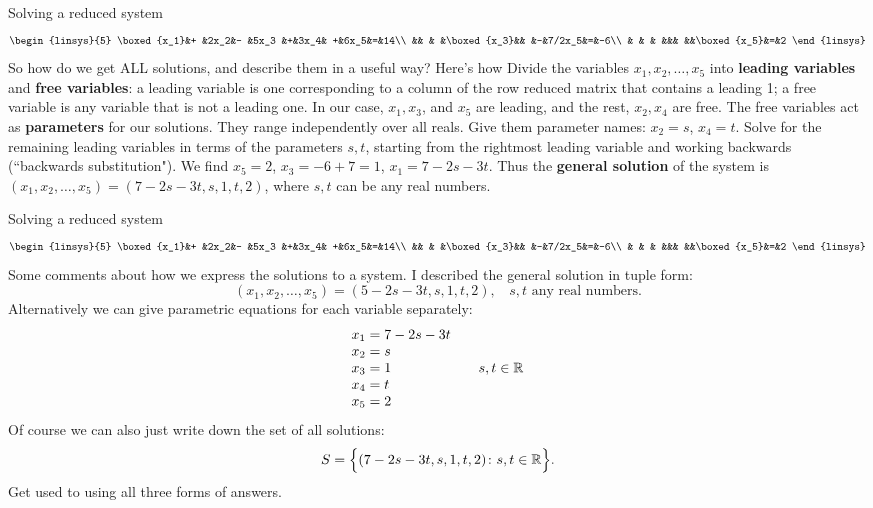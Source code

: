 \begin{frame}{Solving a reduced system}\footnotesize
\footnotesize
\[
\begin{linsys}{5}
\boxed{x_1}&+ &2x_2&- &5x_3 &+&3x_4& +&6x_5&=&14\\
&& & &\boxed{x_3}&& &-&7/2x_5&=&-6\\
 & & & &&& &&\boxed{x_5}&=&2
\end{linsys}
\]
So how do we get \alert{ALL} solutions, and describe them in a useful way? Here's how
\bb
\pause\ii Divide the variables $x_1, x_2, \dots, x_5$ into {\bf leading variables} and {\bf free variables}:
\pause a leading variable is one corresponding to a column of the row reduced matrix that contains a leading 1;
\pause a free variable is any variable that is not a leading one. 
\bpause In our case, $x_1, x_3$, and $x_5$ are leading, and the rest, $x_2, x_4$ are free. 
\pause\ii  The free variables act as {\bf parameters} for our solutions. They range independently over all reals. Give them parameter names: $x_2=s$, $x_4=t$. 
\pause\ii Solve for the remaining leading variables in terms of the parameters $s, t$, starting from the rightmost leading variable and working backwards (``backwards substitution"). 
\pause We find $x_5=2$, $x_3=-6+7=1$, $x_1=7-2s-3t$. 
\ee
\pause Thus the {\bf general solution} of the system is  $(x_1,x_2,\dots,x_5)=(7-2s-3t, s, 1, t, 2)$, where $s,t$ can be any real numbers. 
\end{frame}
\begin{frame}{Solving a reduced system}
\footnotesize
\[
\begin{linsys}{5}
\boxed{x_1}&+ &2x_2&- &5x_3 &+&3x_4& +&6x_5&=&14\\
&& & &\boxed{x_3}&& &-&7/2x_5&=&-6\\
 & & & &&& &&\boxed{x_5}&=&2
\end{linsys}
\]
Some comments about how we express the solutions to a system. 
\bspace 
I described the \alert{general solution} in \alert{tuple form}:
\[
(x_1,x_2,\dots,x_5)=(5-2s-3t, s, 1, t, 2), \  \text{ $s, t$ any real numbers}.
\]
Alternatively we can give \alert{parametric equations} for each variable separately:
\[
\begin{array}{lcl}
x_1=7-2s-3t\\
x_2=s\\
x_3=1& &s,t\in{\mathbb R} \\
x_4=t\\
x_5=2&&
\end{array}
\]
\pause Of course we can also just write down the \alert{set of all solutions}:
\[
S=\Bigl\{(7-2s-3t, s, 1, t, 2) \colon s,t\in{\mathbb R}\Bigr\}.
\]
\pause Get used to using all three forms of answers. 
\end{frame}
